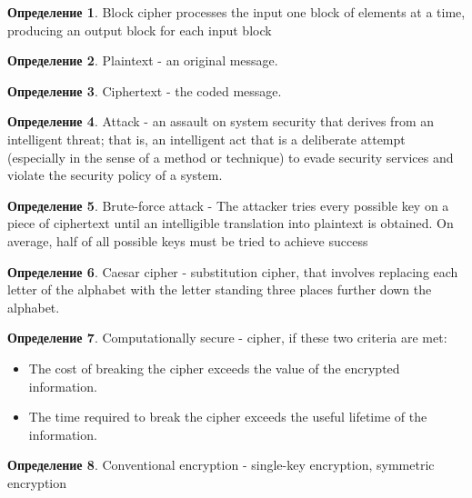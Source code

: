 \documentclass[a4paper]{article}
\theoremstyle{definition}
\newtheorem*{definition}{Определение}
\theoremstyle{remark}
\begin{document}
\begin{definition}
    Block cipher processes the
    input one block of elements at a time, producing an output block for each
    input block
\end{definition}
\begin{definition}
    Plaintext - an original message.
\end{definition}
\begin{definition}
    Ciphertext - the coded message.
\end{definition}
\begin{definition}
    Attack - an assault on system security that derives from an intelligent threat; that is, an intelligent act that is a
deliberate attempt (especially in the sense of a method or technique) to evade security services and
violate the security policy of a system.
\end{definition}
\begin{definition}
    Brute-force attack - The attacker tries every possible key
     on a piece of ciphertext until an intelligible translation into plaintext is obtained. On average, half
    of all possible keys must be tried to achieve success
\end{definition}
\begin{definition}
    Caesar cipher - substitution cipher, that involves
     replacing each letter of the alphabet with the letter standing three places further down the alphabet.
\end{definition}

\begin{definition}
    Computationally secure - cipher, if these two criteria are met:
    \begin{itemize}
        \item The cost of breaking the cipher exceeds the value of the encrypted information.
        \item The time required to break the cipher exceeds the useful lifetime of the
        information.
    \end{itemize}
\end{definition}

\begin{definition}
    Conventional encryption -  single-key
    encryption, symmetric encryption
\end{definition}
\end{document}
